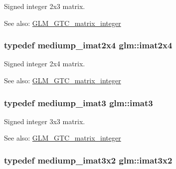 Signed integer 2x3 matrix. \begin{Desc}
\item[See also:]\hyperlink{group__gtc__matrix__integer}{GLM\_\-GTC\_\-matrix\_\-integer} \end{Desc}
\hypertarget{group__gtc__matrix__integer_gfe2d058e164fd1badace451ffcf4ae46}{
\subsubsection[imat2x4]{\setlength{\rightskip}{0pt plus 5cm}typedef mediump\_\-imat2x4 {\bf glm::imat2x4}}}
\label{group__gtc__matrix__integer_gfe2d058e164fd1badace451ffcf4ae46}


Signed integer 2x4 matrix. \begin{Desc}
\item[See also:]\hyperlink{group__gtc__matrix__integer}{GLM\_\-GTC\_\-matrix\_\-integer} \end{Desc}
\hypertarget{group__gtc__matrix__integer_g45481922dd07a3a8e23758286311ee97}{
\subsubsection[imat3]{\setlength{\rightskip}{0pt plus 5cm}typedef mediump\_\-imat3 {\bf glm::imat3}}}
\label{group__gtc__matrix__integer_g45481922dd07a3a8e23758286311ee97}


Signed integer 3x3 matrix. \begin{Desc}
\item[See also:]\hyperlink{group__gtc__matrix__integer}{GLM\_\-GTC\_\-matrix\_\-integer} \end{Desc}
\hypertarget{group__gtc__matrix__integer_g04deef94cdfdd3b3b2706e10a32ef7f3}{
\subsubsection[imat3x2]{\setlength{\rightskip}{0pt plus 5cm}typedef mediump\_\-imat3x2 {\bf glm::imat3x2}}}
\label{group__gtc__matrix__integer_g04deef94cdfdd3b3b2706e10a32ef7f3}


